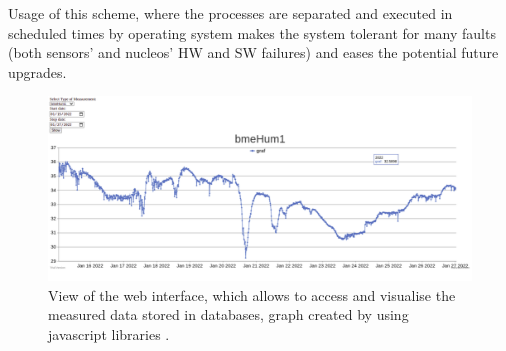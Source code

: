 \par

Usage of this scheme, where the processes are separated and executed in scheduled times by operating system makes the system tolerant for many faults (both sensors' and nucleos' HW and SW failures) and eases the potential future upgrades.



\begin{figure}[H]
 \centering
 \includegraphics[scale=0.25, angle = 0]{./pictures/RemoteWeb.png}
 \caption{View of the web interface, which allows to access and visualise the measured data stored in databases, graph created by using javascript libraries \cite{Canvas}.}
 \label{PMT orientation}
 
\end{figure}

